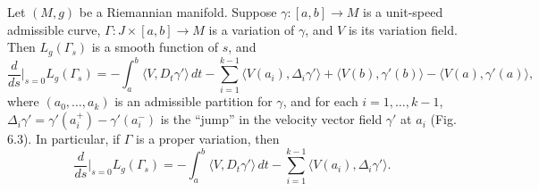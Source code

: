\begin{theorem}
\label{thm:first-variation-formula}

Let $(M,g)$ be a Riemannian manifold. Suppose $\gamma: [a,b] \to M$ is a unit-speed admissible curve, $\Gamma: J \times [a,b] \to M$ is a variation of $\gamma$, and $V$ is its variation field. Then $L_g(\Gamma_s)$ is a smooth function of $s$, and
\begin{equation}
\frac{d}{ds}\bigg|_{s=0} L_g(\Gamma_s) = -\int_a^b \langle V, D_t \gamma'\rangle \, dt - \sum_{i=1}^{k-1} \langle V(a_i), \Delta_i \gamma'\rangle + \langle V(b), \gamma'(b)\rangle - \langle V(a), \gamma'(a)\rangle, \tag{6.1}
\end{equation}
where $(a_0,\ldots,a_k)$ is an admissible partition for $\gamma$, and for each $i = 1,\ldots,k-1$, $\Delta_i \gamma' = \gamma'(a_i^+) - \gamma'(a_i^-)$ is the ``jump'' in the velocity vector field $\gamma'$ at $a_i$ (Fig. 6.3). In particular, if $\Gamma$ is a proper variation, then
\begin{equation}
\frac{d}{ds}\bigg|_{s=0} L_g(\Gamma_s) = -\int_a^b \langle V, D_t \gamma'\rangle \, dt - \sum_{i=1}^{k-1} \langle V(a_i), \Delta_i \gamma'\rangle. \tag{6.2}
\end{equation}
\end{theorem}

